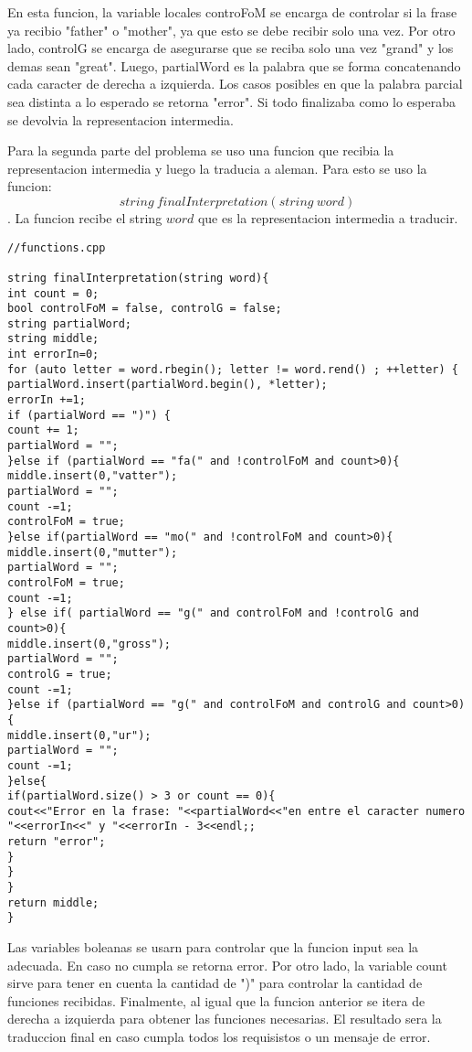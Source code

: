 \documentclass[conference]{IEEEtran}
\begin{document}
En esta funcion, la variable locales controFoM se encarga de controlar si la frase ya recibio "father" o "mother", ya que esto se debe recibir solo una vez. Por otro lado, controlG se encarga de asegurarse que se reciba solo una vez "grand" y los demas sean "great". Luego, partialWord es la palabra que se forma concatenando cada caracter de derecha a izquierda. Los casos posibles en que la palabra parcial sea distinta a lo esperado se retorna "error". Si todo finalizaba como lo esperaba se devolvia la representacion intermedia.

Para la segunda parte del problema se uso una funcion que recibia la representacion intermedia y luego la traducia a aleman. Para esto se uso la funcion: 
$$string\  finalInterpretation(string\  word) $$
. La funcion recibe el string $word$ que es la representacion intermedia a traducir. 

\begin{lstlisting}
//functions.cpp

string finalInterpretation(string word){
int count = 0;
bool controlFoM = false, controlG = false;
string partialWord;
string middle;
int errorIn=0;
for (auto letter = word.rbegin(); letter != word.rend() ; ++letter) {
partialWord.insert(partialWord.begin(), *letter);
errorIn +=1;
if (partialWord == ")") {
count += 1;
partialWord = "";
}else if (partialWord == "fa(" and !controlFoM and count>0){
middle.insert(0,"vatter");
partialWord = "";
count -=1;
controlFoM = true;
}else if(partialWord == "mo(" and !controlFoM and count>0){
middle.insert(0,"mutter");
partialWord = "";
controlFoM = true;
count -=1;
} else if( partialWord == "g(" and controlFoM and !controlG and count>0){
middle.insert(0,"gross");
partialWord = "";
controlG = true;
count -=1;
}else if (partialWord == "g(" and controlFoM and controlG and count>0){
middle.insert(0,"ur");
partialWord = "";
count -=1;
}else{
if(partialWord.size() > 3 or count == 0){
cout<<"Error en la frase: "<<partialWord<<"en entre el caracter numero "<<errorIn<<" y "<<errorIn - 3<<endl;;
return "error";
}
}
}
return middle;
}

\end{lstlisting}

Las variables boleanas se usarn para controlar que la funcion input sea la adecuada. En caso no cumpla se retorna error. Por otro lado, la variable count sirve para tener en cuenta la cantidad de ")" para controlar la cantidad de funciones recibidas. Finalmente, al igual que la funcion anterior se itera de derecha a izquierda para obtener las funciones necesarias. El resultado sera la traduccion final en caso cumpla todos los requisistos o un mensaje de error.
\end{document}
